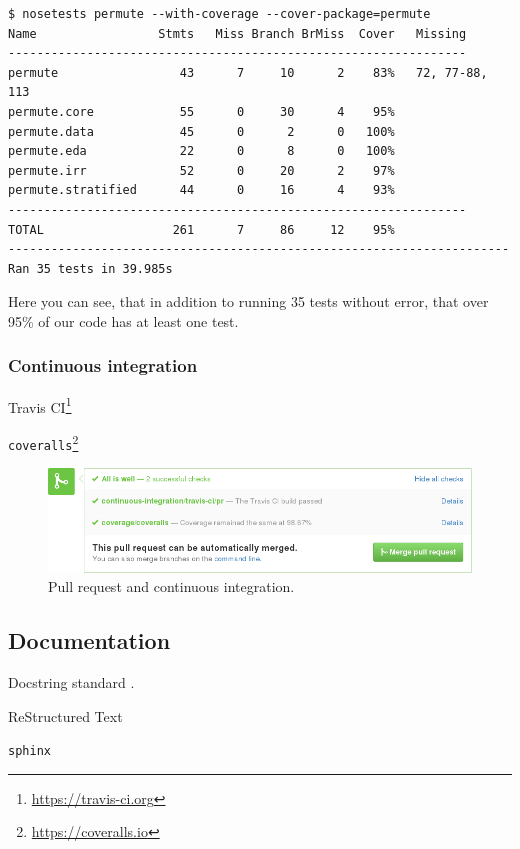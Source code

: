 \begin{verbatim}
$ nosetests permute --with-coverage --cover-package=permute
Name                 Stmts   Miss Branch BrMiss  Cover   Missing
----------------------------------------------------------------
permute                 43      7     10      2    83%   72, 77-88, 113
permute.core            55      0     30      4    95%   
permute.data            45      0      2      0   100%   
permute.eda             22      0      8      0   100%   
permute.irr             52      0     20      2    97%   
permute.stratified      44      0     16      4    93%   
----------------------------------------------------------------
TOTAL                  261      7     86     12    95%   
----------------------------------------------------------------------
Ran 35 tests in 39.985s
\end{verbatim}
Here you can see, that in addition to running 35 tests without error,
that over 95\% of our code has at least one test.

\subsubsection{Continuous integration}

Travis CI\footnote{\url{https://travis-ci.org}}


\texttt{coveralls}\footnote{\url{https://coveralls.io}}

\begin{figure}
  \begin{centering}
    \includegraphics[width=5.5in]{fig/pull-request-ci.png}\par
  \end{centering}

  \caption{\label{fig:pull-request}Pull request and continuous integration.}
\end{figure}

\subsection{Documentation}

Docstring standard \cite{SciPyProceedings_27}.

ReStructured Text

\texttt{sphinx}
